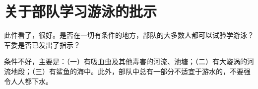 \section[关于部队学习游泳的批示（一九六四年八月六日）]{关于部队学习游泳的批示}


此件看了，很好。是否在一切有条件的地方，部队的大多数人都可以试验学游泳？军委是否已发出了指示？

条件不好，主要是：（一）有吸血虫及其他毒害的河流、池塘；（二）有大漩涡的河流地段；（三）有鲨鱼的海中。此外，部队中总有一部分不适宜于游水的，不要强令人人都下水。


